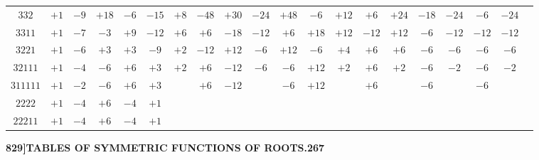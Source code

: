 \documentclass[12pt,a4paper]{article}
\theoremstyle{definition}
\begin{document}
\begin{center}
\begin{tabular}{c|c|c|c|c|c|c|c|c|c|c|c|c|c|c|c|c|c|c|c}
$332$ & $+1$ & $-9$ & $+18$ & $-6$ & $-15$ & $+8$ & $-48$ & $+30$ & $-24$ & $+48$ & $-6$ & $+12$ & $+6$ & $+24$ & $-18$ & $-24$ & $-6$ & $-24$ & \\
$3311$ & $+1$ & $-7$ & $-3$ & $+9$ & $-12$ & $+6$ & $+6$ & $-18$ & $-12$ & $+6$ & $+18$ & $+12$ & $-12$ & $+12$ & $-6$ & $-12$ & $-12$ & $-12$ & \\
$3221$ & $+1$ & $-6$ & $+3$ & $+3$ & $-9$ & $+2$ & $-12$ & $+12$ & $-6$ & $+12$ & $-6$ & $+4$ & $+6$ & $+6$ & $-6$ & $-6$ & $-6$ & $-6$ & \\
$32111$ & $+1$ & $-4$ & $-6$ & $+6$ & $+3$ & $+2$ & $+6$ & $-12$ & $-6$ & $-6$ & $+12$ & $+2$ & $+6$ & $+2$ & $-6$ & $-2$ & $-6$ & $-2$ & \\
$311111$ & $+1$ & $-2$ & $-6$ & $+6$ & $+3$ & & $+6$ & $-12$ & & $-6$ & $+12$ & & $+6$ & & $-6$ & & $-6$ & & \\
$2222$ & $+1$ & $-4$ & $+6$ & $-4$ & $+1$ & & & & & & & & & & & & & & \\
$22211$ & $+1$ & $-4$ & $+6$ & $-4$ & $+1$ & & & & & & & & & & & & & &
\end{tabular}
\end{center}

\newpage
\setcounter{page}{267}

\noindent\textbf{829]}\hfill\textbf{TABLES OF SYMMETRIC FUNCTIONS OF ROOTS.}\hfill\textbf{267}

\bigskip
\end{document}
